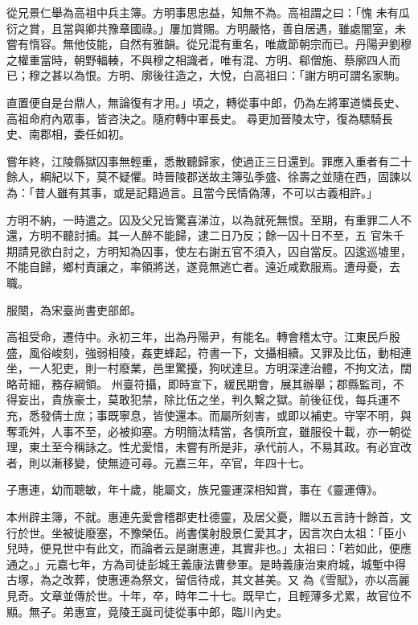 \begin{pinyinscope}
 從兄景仁舉為高祖中兵主簿。方明事思忠益，知無不為。高祖謂之曰：「愧
 未有瓜衍之賞，且當與卿共豫章國祿。」屢加賞賜。方明嚴恪，善自居遇，雖處闇室，未嘗有惰容。無他伎能，自然有雅韻。從兄混有重名，唯歲節朝宗而已。丹陽尹劉穆之權重當時，朝野輻輳，不與穆之相識者，唯有混、方明、郗僧施、蔡廓四人而已；穆之甚以為恨。方明、廓後往造之，大悅，白高祖曰：「謝方明可謂名家駒。



 直置便自是台鼎人，無論復有才用。」頃之，轉從事中郎，仍為左將軍道憐長史、高祖命府內眾事，皆咨決之。隨府轉中軍長史。
 尋更加晉陵太守，復為驃騎長史、南郡相，委任如初。



 嘗年終，江陵縣獄囚事無輕重，悉散聽歸家，使過正三日還到。罪應入重者有二十餘人，綱紀以下，莫不疑懼。時晉陵郡送故主簿弘季盛、徐壽之並隨在西，固諫以為：「昔人雖有其事，或是記籍過言。且當今民情偽薄，不可以古義相許。」



 方明不納，一時遣之。囚及父兄皆驚喜涕泣，以為就死無恨。至期，有重罪二人不還，方明不聽討捕。其一人醉不能歸，逮二日乃反；餘一囚十日不至，五
 官朱千期請見欲白討之，方明知為囚事，使左右謝五官不須入，囚自當反。囚逡巡墟里，不能自歸，鄉村責讓之，率領將送，遂竟無逃亡者。遠近咸歎服焉。遭母憂，去職。



 服闋，為宋臺尚書吏部郎。



 高祖受命，遷侍中。永初三年，出為丹陽尹，有能名。轉會稽太守。江東民戶殷盛，風俗峻刻，強弱相陵，姦吏蜂起，符書一下，文攝相續。又罪及比伍，動相連坐，一人犯吏，則一村廢業，邑里驚擾，狗吠達旦。方明深達治體，不拘文法，闊略苛細，務存綱領。
 州臺符攝，即時宣下，緩民期會，展其辦舉；郡縣監司，不得妄出，貴族豪士，莫敢犯禁，除比伍之坐，判久繫之獄。前後征伐，每兵運不充，悉發倩士庶；事既寧息，皆使還本。而屬所刻害，或即以補吏。守宰不明，與奪乖舛，人事不至，必被抑塞。方明簡汰精當，各慎所宜，雖服役十載，亦一朝從理，東土至今稱詠之。性尤愛惜，未嘗有所是非，承代前人，不易其政。有必宜改者，則以漸移變，使無迹可尋。元嘉三年，卒官，年四十七。



 子惠連，幼而聰敏，年十歲，能屬文，族兄靈運深相知賞，事在《靈運傳》。



 本州辟主簿，不就。惠連先愛會稽郡吏杜德靈，及居父憂，贈以五言詩十餘首，文行於世。坐被徙廢塞，不豫榮伍。尚書僕射殷景仁愛其才，因言次白太祖：「臣小兒時，便見世中有此文，而論者云是謝惠連，其實非也。」太祖曰：「若如此，便應通之。」元嘉七年，方為司徒彭城王義康法曹參軍。是時義康治東府城，城塹中得古塚，為之改葬，使惠連為祭文，留信待成，其文甚美。又
 為《雪賦》，亦以高麗見奇。文章並傳於世。十年，卒，時年二十七。既早亡，且輕薄多尤累，故官位不顯。無子。弟惠宣，竟陵王誕司徒從事中郎，臨川內史。




\end{pinyinscope}
